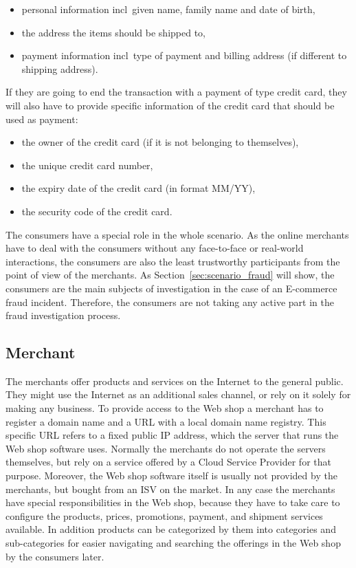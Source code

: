 \begin{itemize}
		\item personal information \gls{incl}\ given name, family name and date of birth,
		\item the address the items should be shipped to,
		\item payment information \gls{incl}\ type of payment and billing address (if different to shipping address).
\end{itemize}

If they are going to end the transaction with a payment of type credit card, they will also have to provide specific information of the credit card that should be used as payment:\@

\begin{itemize}
		\item the owner of the credit card (if it is not belonging to themselves),
		\item the unique credit card number,
		\item the expiry date of the credit card (in format MM/YY),
		\item the security code of the credit card.
\end{itemize}

The consumers have a special role in the whole scenario. As the online merchants have to deal with the consumers without any face-to-face or real-world interactions, the consumers are also the least trustworthy participants from the point of view of the merchants. As Section~\ref{sec:scenario_fraud} will show, the consumers are the main subjects of investigation in the case of an \gls{E-commerce} fraud incident. Therefore, the consumers are not taking any active part in the fraud investigation process.


\subsection{Merchant}
\label{subsec:stakeholder_merchant}

The merchants offer products and services on the Internet to the general public. They might use the Internet as an additional sales channel, or rely on it solely for making any business. To provide access to the Web shop a merchant has to register a domain name and a \gls{URL} with a local domain name registry. This specific \gls{URL} refers to a fixed public \gls{IP} address, which the server that runs the Web shop software uses. Normally the merchants do not operate the servers themselves, but rely on a service offered by a Cloud Service Provider for that purpose. Moreover, the Web shop software itself is usually not provided by the merchants, but bought from an \gls{ISV} on the market. In any case the merchants have special responsibilities in the Web shop, because they have to take care to configure the products, prices, promotions, payment, and shipment services available. In addition products can be categorized by them into categories and sub-categories for easier navigating and searching the offerings in the Web shop by the consumers later. \\

